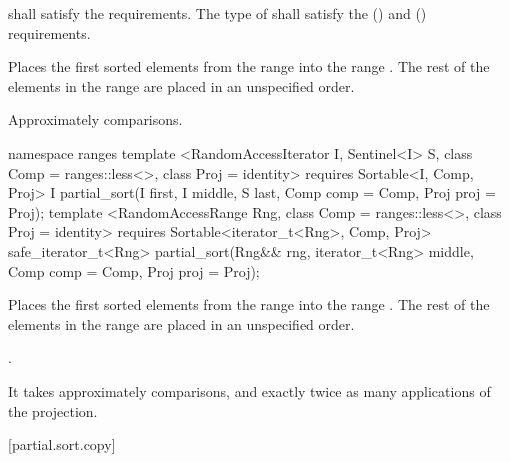 \begin{itemdescr}
\pnum
\requires
{} shall satisfy the
 requirements. The type
of  shall satisfy the
 () and
 () requirements.

\pnum
\effects
Places the first
sorted elements from the range
into the range
.
The rest of the elements in the range
are placed in an unspecified order.
%

\pnum
\complexity
Approximately
comparisons.
\end{itemdescr}

\begin{addedblock}
%
\begin{itemdecl}
namespace ranges {
  template <RandomAccessIterator I, Sentinel<I> S, class Comp = ranges::less<>,
            class Proj = identity>
      requires Sortable<I, Comp, Proj>
    I partial_sort(I first, I middle, S last, Comp comp = Comp{}, Proj proj = Proj{});
  template <RandomAccessRange Rng, class Comp = ranges::less<>, class Proj = identity>
      requires Sortable<iterator_t<Rng>, Comp, Proj>
    safe_iterator_t<Rng> partial_sort(Rng&& rng, iterator_t<Rng> middle, Comp comp = Comp{},
                                      Proj proj = Proj{});
}
\end{itemdecl}

\begin{itemdescr}
\pnum
\effects
Places the first
sorted elements from the range
into the range
.
The rest of the elements in the range
are placed in an unspecified order.
%

\pnum
\returns {}.

\pnum
\complexity
It takes approximately
comparisons, and exactly twice as many applications of the projection.
\end{itemdescr}
\end{addedblock}

[partial.sort.copy]{}

